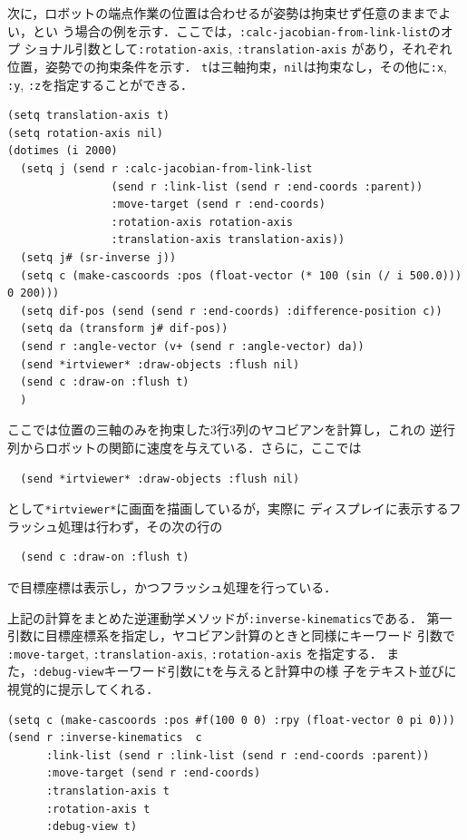 次に，ロボットの端点作業の位置は合わせるが姿勢は拘束せず任意のままでよい，とい
う場合の例を示す．ここでは，\verb|:calc-jacobian-from-link-list|のオプ
ショナル引数として\verb|:rotation-axis|, \verb|:translation-axis|
があり，それぞれ位置，姿勢での拘束条件を示す．
\verb|t|は三軸拘束，\verb|nil|は拘束なし，その他に\verb|:x|,
\verb|:y|, \verb|:z|を指定することができる．

{\baselineskip=10pt
\begin{verbatim}
(setq translation-axis t)
(setq rotation-axis nil)
(dotimes (i 2000)
  (setq j (send r :calc-jacobian-from-link-list
                (send r :link-list (send r :end-coords :parent))
                :move-target (send r :end-coords)
                :rotation-axis rotation-axis
                :translation-axis translation-axis))
  (setq j# (sr-inverse j))
  (setq c (make-cascoords :pos (float-vector (* 100 (sin (/ i 500.0))) 0 200)))
  (setq dif-pos (send (send r :end-coords) :difference-position c))
  (setq da (transform j# dif-pos))
  (send r :angle-vector (v+ (send r :angle-vector) da))
  (send *irtviewer* :draw-objects :flush nil)
  (send c :draw-on :flush t)
  )
\end{verbatim}
}

ここでは位置の三軸のみを拘束した3行3列のヤコビアンを計算し，これの
逆行列からロボットの関節に速度を与えている．さらに，ここでは
{\baselineskip=10pt
\begin{verbatim}
  (send *irtviewer* :draw-objects :flush nil)
\end{verbatim}
}
として\verb|*irtviewer*|に画面を描画しているが，実際に
ディスプレイに表示するフラッシュ処理は行わず，その次の行の
{\baselineskip=10pt
\begin{verbatim}
  (send c :draw-on :flush t)
\end{verbatim}
}
で目標座標は表示し，かつフラッシュ処理を行っている．

上記の計算をまとめた逆運動学メソッドが\verb|:inverse-kinematics|である．
第一引数に目標座標系を指定し，ヤコビアン計算のときと同様にキーワード
引数で
\verb|:move-target|, \verb|:translation-axis|, \verb|:rotation-axis|
を指定する．
また，\verb|:debug-view|キーワード引数に\verb|t|を与えると計算中の様
子をテキスト並びに視覚的に提示してくれる．
{\baselineskip=10pt
\begin{verbatim}
(setq c (make-cascoords :pos #f(100 0 0) :rpy (float-vector 0 pi 0)))
(send r :inverse-kinematics  c
      :link-list (send r :link-list (send r :end-coords :parent))
      :move-target (send r :end-coords)
      :translation-axis t
      :rotation-axis t
      :debug-view t)
\end{verbatim}
}

